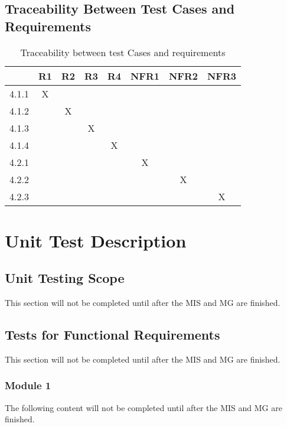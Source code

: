 \documentclass[12pt, titlepage]{article}
\begin{document}
\subsection{Traceability Between Test Cases and Requirements}

\begin{table}
    \centering
    \begin{tabular}{|c|c|c|c|c|c|c|c|}
    \hline 
         & R1 & R2 & R3 & R4 & NFR1 & NFR2 & NFR3\\
    \hline 
        4.1.1 & X &  &  &  &  &  &\\
    \hline 
        4.1.2 &  & X &  &  &  &  &\\
    \hline 
        4.1.3 &  &  & X &  &  &  &\\
    \hline 
        4.1.4 &  &  &  & X &  &  &\\
    \hline 
        4.2.1 &  &  &  &  & X &  &\\
    \hline 
        4.2.2 &  &  &  &  &  & X &\\
    \hline 
        4.2.3 &  &  &  &  &  &  & X\\
    \hline 
    \end{tabular}
    \caption{Traceability between test Cases and requirements}
    \label{tab:reference table}
\end{table}

\newpage
\section{Unit Test Description} \label{sce:unittests}

\subsection{Unit Testing Scope}
This section will not be completed until after the MIS and MG are finished.

\subsection{Tests for Functional Requirements}
This section will not be completed until after the MIS and MG are finished.

\subsubsection{Module 1}
The following content will not be completed until after the MIS and MG are finished.
\end{document}
